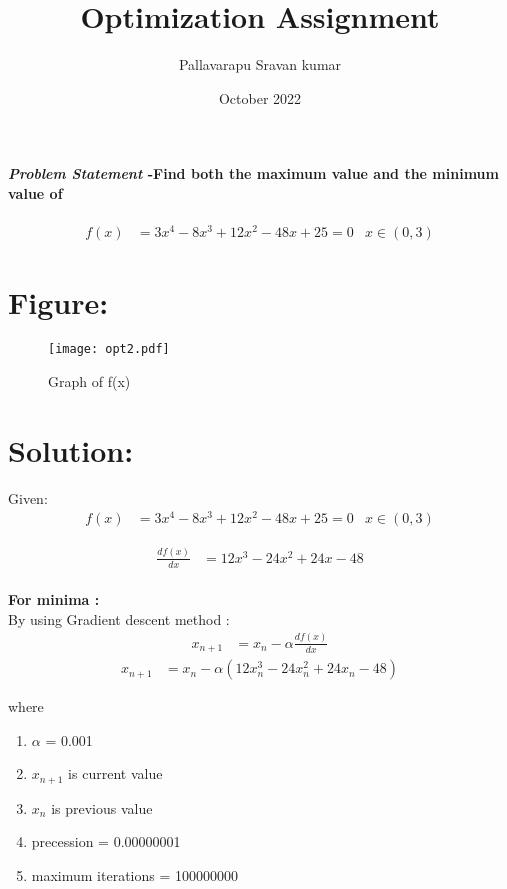 \documentclass[journal,10pt,twocolumn]{article}
\title{\textbf{Optimization Assignment}}
\author{Pallavarapu Sravan kumar}
\date{October 2022}
\begin{document}
\maketitle
\paragraph{\textit{\large Problem Statement} -Find both the maximum value and the minimum value of }

\begin{eqnarray*}
    f(x) &= 3x^4-8x^3+12x^2-48x+25=0 &  x \in (0,3)
\end{eqnarray*}
\section*{\large Figure:}
\begin{figure}[H]
\centering
\texttt{[image: opt2.pdf]}
\caption{Graph of f(x)}
\end{figure}



\section*{Solution:}

Given:
\begin{eqnarray*}
    f(x) &= 3x^4-8x^3+12x^2-48x+25=0 &  x \in (0,3)
\end{eqnarray*}

\begin{eqnarray}
    \frac{df(x)}{dx} &= 12x^3-24x^2+24x-48
\end{eqnarray}
\\
\textbf{For minima :}
\\
By using Gradient descent method :
\begin{eqnarray}
        x_{n+1} &= x_n - \alpha \frac{df(x)}{dx}
\end{eqnarray}
\begin{eqnarray}
         x_{n+1} &= x_n - \alpha (12x_n^3-24x_n^2+24x_n-48)
\end{eqnarray}

where \\
\begin{enumerate}
\item $\alpha$ = 0.001
\item $x_{n+1}$ is current value
\item $x_{n}$ is previous value
\item precession = 0.00000001
\item maximum iterations = 100000000
\end{enumerate}
\end{document}
